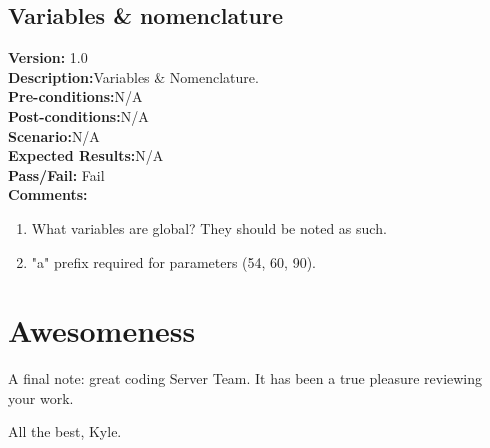 \documentclass[12pt]{article}
\begin{document}
    \subsection{Variables \& nomenclature}
    \textbf{Version:} 1.0\\
    \textbf{Description:}Variables \& Nomenclature.\\
    \textbf{Pre-conditions:}N/A\\
    \textbf{Post-conditions:}N/A\\
    \textbf{Scenario:}N/A\\
    \textbf{Expected Results:}N/A\\
    \textbf{Pass/Fail:} Fail\\
    \textbf{Comments:}
    \begin{enumerate}
        \item What variables are global? They should be noted as such.
        \item"a" prefix required for parameters (54, 60, 90).
    \end{enumerate}

\newpage

\section{Awesomeness}
\label{sec:awesomeness}

A final note: great coding Server Team.  It has been a true pleasure reviewing your work.

All the best, Kyle.
\end{document}
